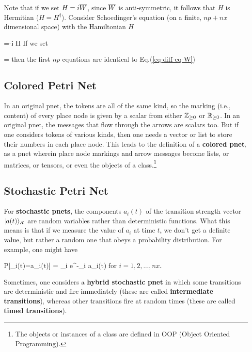 Note that if we set $H = i\overline{W}$,
since $\overline{W}$ is anti-symmetric,
it follows that  $H$ is Hermitian ($H=H^\dagger$). Consider Schoedinger's equation 
(on a finite, $np+nx$ dimensional space)
with the Hamiltonian $H$

\beq
{} =-i H 
\eeq 
If we set

\beq
{} =
\eeq
then the first $np$ equations are identical to Eq.(\ref{eq-diff-eq-W})





\subsection{Colored Petri Net}
In an original pnet, the tokens
are all of the same kind,
so the marking (i.e., content)
of every place node is given by a scalar
from either ${\mathbb{Z}}_{\geq 0}$
or ${ \mathbb{R}}_{\geq 0}$.
In an original pnet,
the messages that flow through the arrows
are scalars too.
But if one considers
tokens of various kinds,
then one needs a vector or list  to
store their numbers in each place node.
This leads
to the definition of a {\bf colored pnet},
as a pnet wherein
place node markings
and arrow messages become lists, or matrices, or  tensors,
or even
the objects of 
a class.\footnote{The objects
or instances 
of a class are defined in OOP (Object Oriented Programming).}


\subsection{Stochastic Petri Net}
For {\bf stochastic pnets},
the components $a_i(t)$ of the transition strength vector $|a(t)\rangle_{\cal X}$  are random variables rather than deterministic functions.
What this means is that if we measure the value of $a_i$ at time $t$,
we don't get a definite value, but rather a random one that obeys a probability distribution. For example, one might have


\beq
P[\rva_i(t)=a_i(t)] = \lam_i e^{-\lam_i a_i(t)}
\;\; 
\eeq
for $i=1,2, \ldots , nx$. 

Sometimes, one considers a {\bf hybrid stochastic pnet} in which some transitions are 
deterministic and fire immediately (these are called {\bf intermediate transitions}), whereas
other transitions fire at random times (these are called {\bf timed transitions}).

